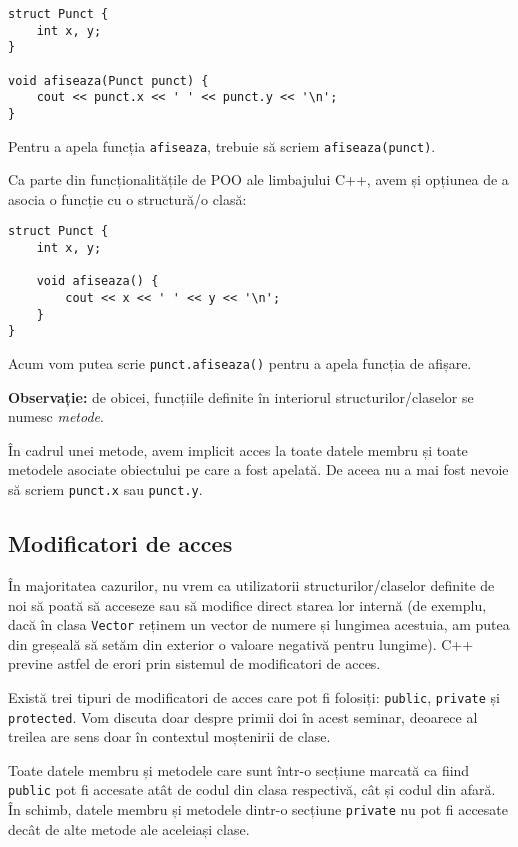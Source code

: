 \begin{lstlisting}
struct Punct {
    int x, y;
}

void afiseaza(Punct punct) {
    cout << punct.x << ' ' << punct.y << '\n';
}
\end{lstlisting}

Pentru a apela funcția \texttt{afiseaza}, trebuie să scriem \texttt{afiseaza(punct)}.

Ca parte din funcționalitățile de POO ale limbajului C++, avem și opțiunea de a asocia o funcție cu o structură/o clasă:

\begin{lstlisting}
struct Punct {
    int x, y;

    void afiseaza() {
        cout << x << ' ' << y << '\n';
    }
}
\end{lstlisting}
Acum vom putea scrie \texttt{punct.afiseaza()} pentru a apela funcția de afișare.

\textbf{Observație:} de obicei, funcțiile definite în interiorul structurilor/claselor se numesc \emph{metode}.

În cadrul unei metode, avem implicit acces la toate datele membru și toate metodele asociate obiectului pe care a fost apelată. De aceea nu a mai fost nevoie să scriem \texttt{punct.x} sau \texttt{punct.y}.

\subsection*{Modificatori de acces}

În majoritatea cazurilor, nu vrem ca utilizatorii structurilor/claselor definite de noi să poată să acceseze sau să modifice direct starea lor internă (de exemplu, dacă în clasa \texttt{Vector} reținem un vector de numere și lungimea acestuia, am putea din greșeală să setăm din exterior o valoare negativă pentru lungime). C++ previne astfel de erori prin sistemul de modificatori de acces.

Există trei tipuri de modificatori de acces care pot fi folosiți: \texttt{public}, \texttt{private} și \texttt{protected}. Vom discuta doar despre primii doi în acest seminar, deoarece al treilea are sens doar în contextul moștenirii de clase.

Toate datele membru și metodele care sunt într-o secțiune marcată ca fiind \texttt{public} pot fi accesate atât de codul din clasa respectivă, cât și codul din afară. În schimb, datele membru și metodele dintr-o secțiune \texttt{private} nu pot fi accesate decât de alte metode ale aceleiași clase.

